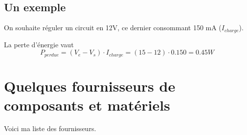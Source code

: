 \documentclass[12pt]{report}
\begin{document}
  \subsection{Un exemple}

  On souhaite réguler un circuit en 12V, ce dernier consommant 150 mA ($I_{charge}$).

  La perte d'énergie vaut $$ P_{perdue} =(V_e-V_s)\cdot I_{charge} =(15-12)\cdot 0.150 = 0.45 W$$





  \appendix

  \section{Quelques fournisseurs de composants et matériels}

  Voici ma liste des fournisseurs.
\end{document}
